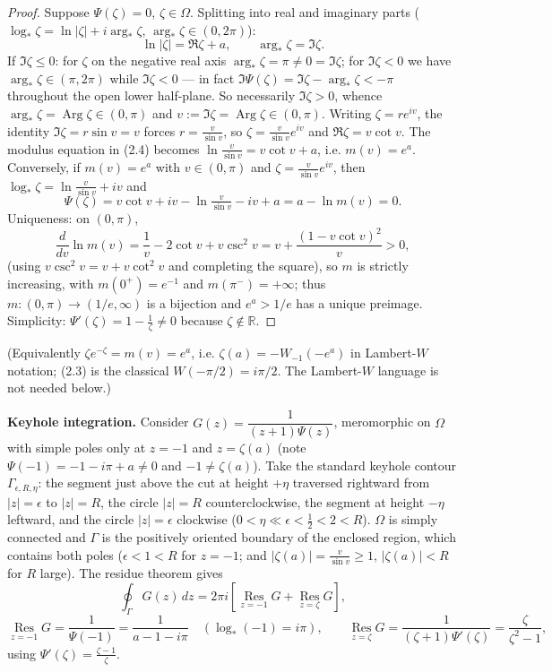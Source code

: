 \documentclass[11pt]{article}
\theoremstyle{remark}
\begin{document}
\begin{proof}
Suppose $\Psi(\zeta)=0$, $\zeta\in\Omega$. Splitting into real and imaginary parts ($\log_*\zeta=\ln|\zeta|+i\arg_*\zeta$, $\arg_*\zeta\in(0,2\pi)$):
\begin{equation*}
\ln|\zeta|=\Re\zeta+a,\qquad \arg_*\zeta=\Im\zeta. \tag{2.4}
\end{equation*}
If $\Im\zeta\le0$: for $\zeta$ on the negative real axis $\arg_*\zeta=\pi\neq0=\Im\zeta$; for $\Im\zeta<0$ we have $\arg_*\zeta\in(\pi,2\pi)$ while $\Im\zeta<0$ — in fact $\Im\Psi(\zeta)=\Im\zeta-\arg_*\zeta<-\pi$ throughout the open lower half-plane. So necessarily $\Im\zeta>0$, whence $\arg_*\zeta=\operatorname{Arg}\zeta\in(0,\pi)$ and $v:=\Im\zeta=\operatorname{Arg}\zeta\in(0,\pi)$. Writing $\zeta=re^{iv}$, the identity $\Im\zeta=r\sin v=v$ forces $r=\frac{v}{\sin v}$, so $\zeta=\frac{v}{\sin v}e^{iv}$ and $\Re\zeta=v\cot v$. The modulus equation in (2.4) becomes $\ln\frac{v}{\sin v}=v\cot v+a$, i.e. $m(v)=e^{a}$. Conversely, if $m(v)=e^a$ with $v\in(0,\pi)$ and $\zeta=\frac{v}{\sin v}e^{iv}$, then $\log_*\zeta=\ln\frac{v}{\sin v}+iv$ and
$$\Psi(\zeta)=v\cot v+iv-\ln\tfrac{v}{\sin v}-iv+a=a-\ln m(v)=0 .$$
Uniqueness: on $(0,\pi)$,
$$\frac{d}{dv}\ln m(v)=\frac1v-2\cot v+v\csc^2v
= v+\frac{(1-v\cot v)^2}{v}>0,$$
(using $v\csc^2v=v+v\cot^2 v$ and completing the square), so $m$ is strictly increasing, with $m(0^+)=e^{-1}$ and $m(\pi^-)=+\infty$; thus $m:(0,\pi)\to(1/e,\infty)$ is a bijection and $e^{a}>1/e$ has a unique preimage. Simplicity: $\Psi'(\zeta)=1-\frac1\zeta\neq0$ because $\zeta\notin\mathbb{R}$.
\end{proof}

(Equivalently $\zeta e^{-\zeta}=m(v)=e^{a}$, i.e. $\zeta(a)=-W_{-1}(-e^{a})$ in Lambert-$W$ notation; (2.3) is the classical $W(-\pi/2)=i\pi/2$. The Lambert-$W$ language is not needed below.)

\textbf{Keyhole integration.} Consider $G(z)=\dfrac{1}{(z+1)\Psi(z)}$, meromorphic on $\Omega$ with simple poles only at $z=-1$ and $z=\zeta(a)$ (note $\Psi(-1)=-1-i\pi+a\ne0$ and $-1\neq\zeta(a)$). Take the standard keyhole contour $\Gamma_{\epsilon,R,\eta}$: the segment just above the cut at height $+\eta$ traversed rightward from $|z|=\epsilon$ to $|z|=R$, the circle $|z|=R$ counterclockwise, the segment at height $-\eta$ leftward, and the circle $|z|=\epsilon$ clockwise ($0<\eta\ll\epsilon<\tfrac12<2<R$). $\Omega$ is simply connected and $\Gamma$ is the positively oriented boundary of the enclosed region, which contains both poles ($\epsilon<1<R$ for $z=-1$; and $|\zeta(a)|=\frac{v}{\sin v}\ge1$, $|\zeta(a)|<R$ for $R$ large). The residue theorem gives
$$\oint_{\Gamma}G(z)\,dz=2\pi i\left[\operatorname*{Res}_{z=-1}G+\operatorname*{Res}_{z=\zeta}G\right],$$
$$\operatorname*{Res}_{z=-1}G=\frac{1}{\Psi(-1)}=\frac{1}{a-1-i\pi}\quad(\log_*(-1)=i\pi),\qquad
\operatorname*{Res}_{z=\zeta}G=\frac{1}{(\zeta+1)\Psi'(\zeta)}=\frac{\zeta}{\zeta^{2}-1},$$
using $\Psi'(\zeta)=\frac{\zeta-1}{\zeta}$.
\end{document}

